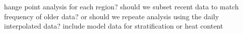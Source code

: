 \markdownRendererDocumentBegin
\markdownRendererUlBeginTight
\markdownRendererUlItem hange point analysis for each region?\markdownRendererUlItemEnd 
\markdownRendererUlItem should we subset recent data to match frequency of older data? or should we repeate analysis using the daily interpolated data?\markdownRendererUlItemEnd 
\markdownRendererUlItem include model data for stratification or heat content\markdownRendererUlItemEnd 
\markdownRendererUlEndTight \markdownRendererDocumentEnd